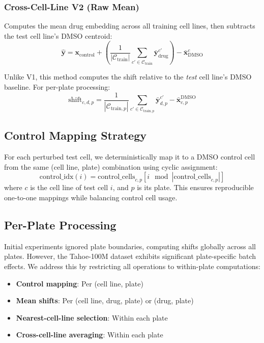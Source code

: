 \documentclass[conference]{IEEEtran}
\begin{document}
\subsubsection{Cross-Cell-Line V2 (Raw Mean)}

Computes the mean drug embedding across all training cell lines, then subtracts the test cell line's DMSO centroid:
\begin{equation}
\hat{\mathbf{y}} = \mathbf{x}_{\text{control}} + \left(\frac{1}{|\mathcal{C}_{\text{train}}|} \sum_{c' \in \mathcal{C}_{\text{train}}} \bar{\mathbf{y}}_{\text{drug}}^{c'}\right) - \bar{\mathbf{x}}_{\text{DMSO}}^{c}
\end{equation}

Unlike V1, this method computes the shift relative to the \textit{test} cell line's DMSO baseline. For per-plate processing:
\begin{equation}
\text{shift}_{c,d,p} = \frac{1}{|\mathcal{C}_{\text{train},p}|} \sum_{c' \in \mathcal{C}_{\text{train},p}} \bar{\mathbf{y}}_{d,p}^{c'} - \bar{\mathbf{x}}_{c,p}^{\text{DMSO}}
\end{equation}

\subsection{Control Mapping Strategy}

For each perturbed test cell, we deterministically map it to a DMSO control cell from the same (cell line, plate) combination using cyclic assignment:
\begin{equation}
\text{control\_idx}(i) = \text{control\_cells}_{c,p}[i \mod |\text{control\_cells}_{c,p}|]
\end{equation}
where $c$ is the cell line of test cell $i$, and $p$ is its plate. This ensures reproducible one-to-one mappings while balancing control cell usage.

\subsection{Per-Plate Processing}

Initial experiments ignored plate boundaries, computing shifts globally across all plates. However, the Tahoe-100M dataset exhibits significant plate-specific batch effects. We address this by restricting all operations to within-plate computations:

\begin{itemize}
    \item \textbf{Control mapping}: Per (cell line, plate)
    \item \textbf{Mean shifts}: Per (cell line, drug, plate) or (drug, plate)
    \item \textbf{Nearest-cell-line selection}: Within each plate
    \item \textbf{Cross-cell-line averaging}: Within each plate
\end{itemize}
\end{document}
